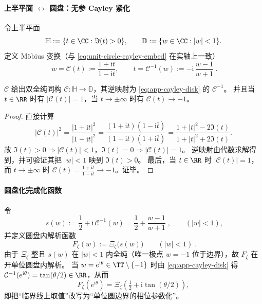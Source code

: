 \paragraph{上半平面 \texorpdfstring{$\leftrightarrow$}{<->} 圆盘：无参 Cayley 紧化}
令上半平面
\[
\mathbb{H}:=\{t\in\CC:\Im(t)>0\},
\qquad
\mathbb{D}:=\{w\in\CC:|w|<1\}.
\]
定义 Möbius 变换（与 \eqref{eq:unit-circle-cayley-embed} 在实轴上一致）
\begin{equation}\label{eq:app-cayley-disk}
\boxed{\;
w=\mathcal{C}(t):=\frac{1+\mathrm{i}t}{1-\mathrm{i}t},
\qquad
t=\mathcal{C}^{-1}(w):=-\mathrm{i}\,\frac{w-1}{w+1}\; }.
\end{equation}

\begin{proposition}\label{prop:app-cayley-upperhalf-disk}
\(\mathcal{C}\) 给出双全纯同构 \(\mathcal{C}:\mathbb{H}\to\mathbb{D}\)，其逆映射为 \eqref{eq:app-cayley-disk} 的 \(\mathcal{C}^{-1}\)。
并且当 \(t\in\RR\) 时有 \(|\mathcal{C}(t)|=1\)，当 \(t\to\pm\infty\) 时有 \(\mathcal{C}(t)\to-1\)。
\end{proposition}
\begin{proof}
直接计算
\[
|\mathcal{C}(t)|^2
=\frac{|1+\mathrm{i}t|^2}{|1-\mathrm{i}t|^2}
=\frac{(1+\mathrm{i}t)(1-\mathrm{i}\overline t)}{(1-\mathrm{i}t)(1+\mathrm{i}\overline t)}
=\frac{1+|t|^2-2\Im(t)}{1+|t|^2+2\Im(t)}.
\]
故 \(\Im(t)>0\Rightarrow |\mathcal{C}(t)|<1\)，\(\Im(t)=0\Rightarrow |\mathcal{C}(t)|=1\)。
逆映射由代数求解得到，并可验证其把 \(|w|<1\) 映到 \(\Im(t)>0\)。
最后，当 \(t\in\RR\) 时 \(|\mathcal{C}(t)|=1\)，而 \(t\to\pm\infty\) 时 \(\mathcal{C}(t)=\frac{1+\mathrm{i}t}{1-\mathrm{i}t}\to-1\)。证毕。
\end{proof}

\paragraph{圆盘化完成化函数}
令
\begin{equation}\label{eq:app-s-of-w}
\boxed{\;
s(w):=\frac12+\mathrm{i}\,\mathcal{C}^{-1}(w)
=\frac12+\frac{w-1}{w+1}\; },
\qquad (|w|<1),
\end{equation}
并定义圆盘内解析函数
\begin{equation}\label{eq:app-Fzeta-disk}
\boxed{\;
F_{\zeta}(w):=\Xi_{\zeta}\!\bigl(s(w)\bigr)\qquad(|w|<1)\; }.
\end{equation}
由于 \(\Xi_{\zeta}\) 整且 \(s(w)\) 在 \(|w|<1\) 内全纯（唯一极点 \(w=-1\) 位于边界），故 \(F_{\zeta}\) 在开单位圆盘内解析。
当 \(w=e^{\mathrm{i}\theta}\in\TT\setminus\{-1\}\) 时由 \eqref{eq:app-cayley-disk} 得 \(\mathcal{C}^{-1}(e^{\mathrm{i}\theta})=\tan(\theta/2)\in\RR\)，从而
\begin{equation}\label{eq:app-Fzeta-boundary}
F_{\zeta}(e^{\mathrm{i}\theta})=\Xi_{\zeta}\!\left(\tfrac12+\mathrm{i}\tan(\theta/2)\right),
\end{equation}
即把“临界线上取值”改写为“单位圆边界的相位参数化”。

